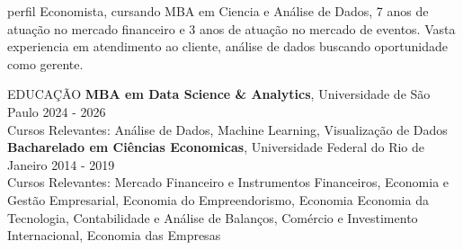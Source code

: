 \documentclass{resume} %
\begin{document}
\begin{rSection}{perfil}
{Economista, cursando MBA em Ciencia e Análise de Dados, 7 anos de atuação no mercado financeiro e 3 anos de atuação no mercado de eventos. Vasta experiencia em atendimento ao cliente, análise de dados  buscando oportunidade como gerente.}
\end{rSection}


\begin{rSection}{EDUCAÇÃO}
{\bf MBA em Data Science \& Analytics}, Universidade de São Paulo \hfill {2024 - 2026}\\
{\footnotesize Cursos Relevantes: Análise de Dados, Machine Learning, Visualização de Dados} \\

\vspace{-1.25em}
{\bf Bacharelado em Ciências Economicas}, Universidade Federal do Rio de Janeiro \hfill {2014 - 2019} \\
{\footnotesize Cursos Relevantes: Mercado Financeiro e Instrumentos Financeiros, Economia e Gestão Empresarial, Economia do Empreendorismo, Economia Economia da Tecnologia, Contabilidade e Análise de Balanços, Comércio e Investimento Internacional, Economia das Empresas} 
\end{rSection}
\end{document}
